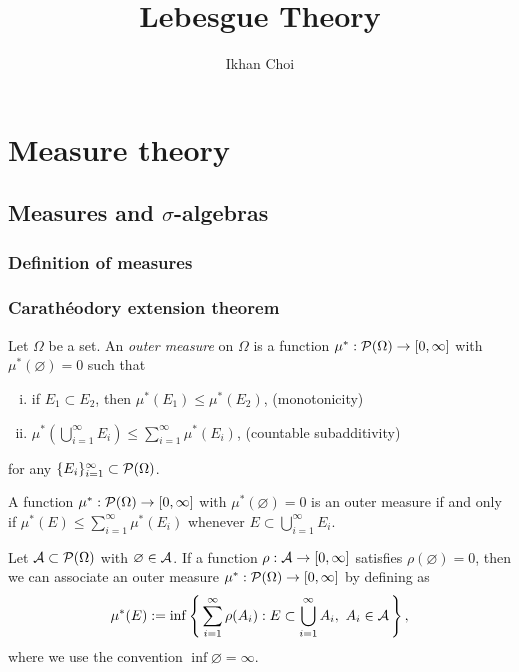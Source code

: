 \documentclass{../note}
\begin{document}
\title{Lebesgue Theory}
\author{Ikhan Choi}
\maketitle
\tableofcontents

\part{Measure theory}



\chapter{Measures and $\sigma$-algebras}

\section{Definition of measures}

\section{Carath\'eodory extension theorem}

\begin{prb}
Let $\Omega$ be a set.
An \emph{outer measure} on $\Omega$ is a function $\mu^*:\mathcal{P}(\Omega)\to[0,\infty]$ with $\mu^*(\varnothing)=0$ such that
\begin{enumerate}[(i)]
\item if $E_1\subset E_2$, then $\mu^*(E_1)\le\mu^*(E_2)$,
\hfill(monotonicity)
\item $\mu^*(\bigcup_{i=1}^\infty E_i)\le\sum_{i=1}^\infty\mu^*(E_i)$,
\hfill(countable subadditivity)
\end{enumerate}
for any $\{E_i\}_{i=1}^\infty\subset\mathcal{P}(\Omega)$.
\begin{parts}
\item A function $\mu^*:\mathcal{P}(\Omega)\to[0,\infty]$ with $\mu^*(\varnothing)=0$ is an outer measure if and only if $\mu^*(E)\le\sum_{i=1}^\infty\mu^*(E_i)$ whenever $E\subset\bigcup_{i=1}^\infty E_i$.
\item
Let $\mathcal{A}\subset\mathcal{P}(\Omega)$ with $\varnothing\in\mathcal{A}$.
If a function $\rho:\mathcal{A}\to[0,\infty]$ satisfies $\rho(\varnothing)=0$, then we can associate an outer measure $\mu^*:\mathcal{P}(\Omega)\to[0,\infty]$ by defining as
\[\mu^*(E):=\inf\left\{\,\sum_{i=1}^\infty\rho(A_i):E\subset\bigcup_{i=1}^\infty A_i,\ A_i\in\mathcal{A}\,\right\},\]
where we use the convention $\inf\varnothing=\infty$.
\end{parts}
\end{prb}
\end{document}
